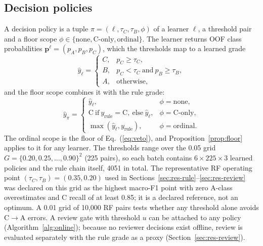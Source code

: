 \documentclass[journal]{IEEEtran}
\newcommand{\CtoA}{C$\rightarrow$A}
\begin{document}
\subsection{Decision policies}
\label{sec:policies}
A decision policy is a tuple $\pi=(\ell,\tau_C,\tau_B,\phi)$ of a learner $\ell$, a threshold pair and a floor scope $\phi\in\{\text{none},\text{C-only},\text{ordinal}\}$. The learner returns OOF class probabilities $\mathbf p^{\ell}=(p_A,p_B,p_C)$, which the thresholds map to a learned grade
\begin{equation}
\hat y_{\ell}=\begin{cases}
C,&p_C\geq\tau_C,\\
B,&p_C<\tau_C\ \text{and}\ p_B\geq\tau_B,\\
A,&\text{otherwise},
\end{cases}
\label{eq:threshold}
\end{equation}
and the floor scope combines it with the rule grade:
\begin{equation}
\hat y_\pi=\begin{cases}
\hat y_{\ell},&\phi=\text{none},\\
\mathrm{C}\ \text{if}\ y_{\mathrm{rule}}=\mathrm{C},\ \text{else}\ \hat y_{\ell},&\phi=\text{C-only},\\
\max(\hat y_{\ell},y_{\mathrm{rule}}),&\phi=\text{ordinal}.
\end{cases}
\label{eq:scope}
\end{equation}
The ordinal scope is the floor of Eq.~(\ref{eq:veto}), and Proposition~\ref{prop:floor} applies to it for any learner. The thresholds range over the 0.05 grid $G=\{0.20,0.25,\ldots,0.90\}^2$ (225 pairs), so each batch contains $6\times225\times3$ learned policies and the rule chain itself, 4051 in total. The representative RF operating point $(\tau_C,\tau_B)=(0.35,0.20)$ used in Sections~\ref{sec:res-rule}--\ref{sec:res-review} was declared on this grid as the highest macro-F1 point with zero A-class overestimates and C recall of at least 0.85; it is a declared reference, not an optimum. A 0.01 grid of 10{,}000 RF pairs tests whether any threshold alone avoids \CtoA{} errors. A review gate with threshold $u$ can be attached to any policy (Algorithm~\ref{alg:online}); because no reviewer decisions exist offline, review is evaluated separately with the rule grade as a proxy (Section~\ref{sec:res-review}).
\end{document}
